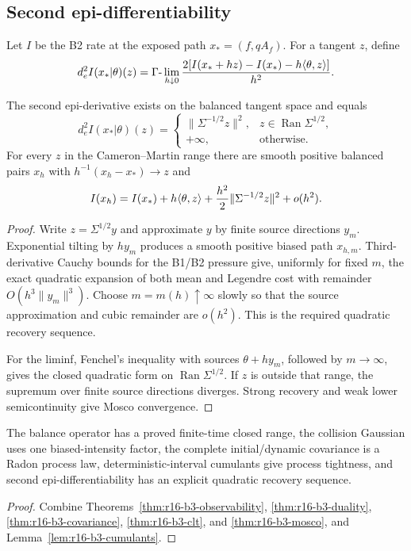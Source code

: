\subsection{Second epi-differentiability}

Let \(I\) be the B2 rate at the exposed path \(x_*=(f,qA_f)\).  For a tangent
\(z\), define
\[
 d_e^2I(x_*|\theta)(z)
 =\Gamma\hbox{-}\lim_{h\downarrow0}
 {2[I(x_*+hz)-I(x_*)-h\langle\theta,z\rangle]\over h^2}.
\]

\begin{theorem}
\label{thm:r16-b3-mosco}
The second epi-derivative exists on the balanced tangent space and equals
\[
 d_e^2I(x_*|\theta)(z)=
 \begin{cases}
 \|\Sigma^{-1/2}z\|^2,
 &z\in\operatorname{Ran}\Sigma^{1/2},\\
 +\infty,&\text{otherwise}.
 \end{cases}
\]
For every \(z\) in the Cameron--Martin range there are smooth positive
balanced pairs \(x_h\) with
\(h^{-1}(x_h-x_*)\to z\) and
\[
 I(x_h)=I(x_*)+h\langle\theta,z\rangle
 +{h^2\over2}\|\Sigma^{-1/2}z\|^2+o(h^2).
\]
\end{theorem}

\begin{proof}
Write \(z=\Sigma^{1/2}y\) and approximate \(y\) by finite source directions
\(y_m\).  Exponential tilting by \(hy_m\) produces a smooth positive biased
path \(x_{h,m}\).  Third-derivative Cauchy bounds for the B1/B2 pressure give,
uniformly for fixed \(m\), the exact quadratic expansion of both mean and
Legendre cost with remainder \(O(h^3\|y_m\|^3)\).  Choose
\(m=m(h)\uparrow\infty\) slowly so that the source approximation and cubic
remainder are \(o(h^2)\).  This is the required quadratic recovery sequence.

For the liminf, Fenchel's inequality with sources
\(\theta+hy_m\), followed by \(m\to\infty\), gives the closed quadratic form
on \(\operatorname{Ran}\Sigma^{1/2}\).  If \(z\) is outside that range, the
supremum over finite source directions diverges.  Strong recovery and weak
lower semicontinuity give Mosco convergence.
\end{proof}

\begin{theorem}
\label{thm:r16-b3-main}
The balance operator has a proved finite-time closed range, the collision
Gaussian uses one biased-intensity factor, the complete initial/dynamic
covariance is a Radon process law, deterministic-interval cumulants give
process tightness, and second epi-differentiability has an explicit quadratic
recovery sequence.
\end{theorem}

\begin{proof}
Combine Theorems~\ref{thm:r16-b3-observability},
\ref{thm:r16-b3-duality}, \ref{thm:r16-b3-covariance},
\ref{thm:r16-b3-clt}, and \ref{thm:r16-b3-mosco}, and
Lemma~\ref{lem:r16-b3-cumulants}.
\end{proof}
